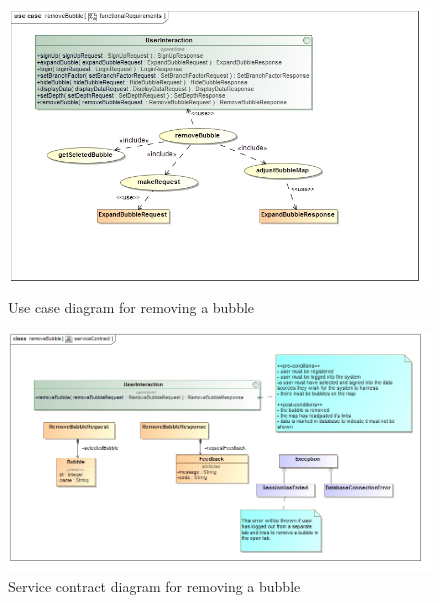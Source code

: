 \documentclass[hidelinks,english]{article}
\begin{document}
    			\begin{figure}[!h]
    			\includegraphics[width=\linewidth]{functionalRequirementsRemoveBubble.jpg}
    			\caption{Use case diagram for removing a bubble}
    			\label{UseCaseRmoveBubble}
    			\end{figure}
    			
    			\begin{figure}[!h]
    			\includegraphics[width=\linewidth]{serviceContractRemoveBubble.jpg}
    			\caption{Service contract diagram for removing a bubble}
    			\label{ServiceContractRemoveBubble}
    			\end{figure}
    		
    		
\end{document}
